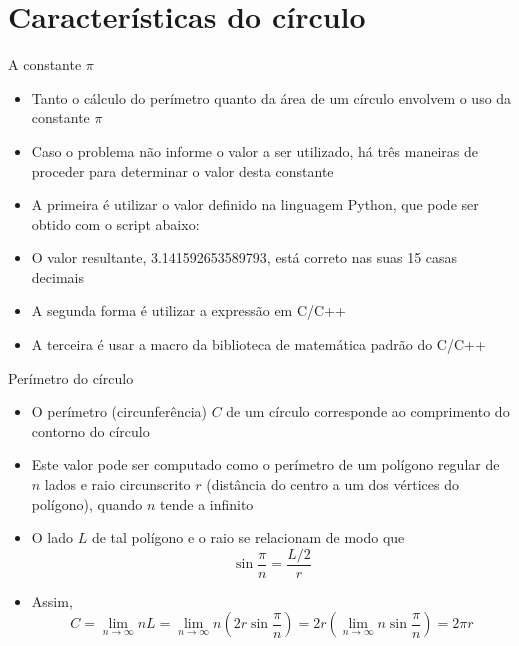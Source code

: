 \section{Características do círculo}

\begin{frame}[fragile]{A constante $\pi$}

    \begin{itemize}
        \item Tanto o cálculo do perímetro quanto da área de um círculo envolvem o uso da 
            constante $\pi$
        \pause

        \item Caso o problema não informe o valor a ser utilizado, há três maneiras de proceder 
            para determinar o valor desta constante
        \pause

        \item A primeira é utilizar o valor definido na linguagem Python, que pode ser obtido com 
            o script abaixo:

        \pause

        \item O valor resultante, 3.141592653589793, está correto nas suas 15 casas decimais
        \pause

        \item A segunda forma é utilizar a expressão  em C/C++
        \pause

        \item A terceira é usar a macro  da biblioteca de matemática padrão do
            C/C++
    \end{itemize}

\end{frame}

\begin{frame}[fragile]{Perímetro do círculo}

    \begin{itemize}
        \item O perímetro (circunferência) $C$ de um círculo corresponde ao comprimento do contorno do círculo 
        \pause

        \item Este valor pode ser computado como o perímetro de um polígono regular de $n$ lados e
            raio circunscrito $r$ (distância do centro a um dos vértices do polígono), 
            quando $n$ tende a infinito
        \pause

        \item O lado $L$ de tal polígono e o raio se relacionam de modo que
        \[
            \sin \frac{\pi}{n} = \frac{L/2}{r} 
        \]
        \pause

        \item Assim,
        \[
            C = \lim_{n \to \infty} nL
            = \lim_{n \to \infty} n\left(2r\sin \frac{\pi}{n}\right) 
            = 2r \left(\lim_{n \to \infty} n\sin \frac{\pi}{n}\right)
            = 2\pi r
        \]

    \end{itemize}

\end{frame}

